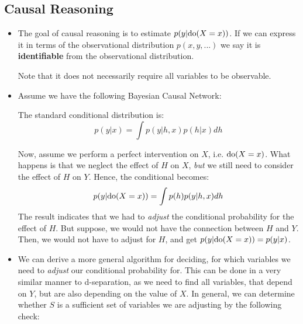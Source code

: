 \subsection{Causal Reasoning}
\begin{itemize}
	\item The goal of causal reasoning is to estimate $p(y|\textnormal{do}(X=x))$. If we can express it in terms of the observational distribution $p(x,y,...)$ we say it is \textbf{identifiable} from the observational distribution. 
	
	Note that it does not necessarily require all variables to be observable.
	\item Assume we have the following Bayesian Causal Network:
	
	\begin{figure}[ht!]
		\centering
	\end{figure}

	The standard conditional distribution is:
	$$p(y|x)=\int p(y|h,x)p(h|x)dh$$

	Now, assume we perform a perfect intervention on $X$, i.e. $\textnormal{do}(X=x)$. What happens is that we neglect the effect of $H$ on $X$, \textit{but} we still need to consider the effect of $H$ on $Y$. Hence, the conditional becomes:
	$$p(y|\textnormal{do}(X=x))=\int p(h)p(y|h,x)dh$$
	The result indicates that we had to \textit{adjust} the conditional probability for the effect of $H$. But suppose, we would not have the connection between $H$ and $Y$. Then, we would not have to adjust for $H$, and get $p(y|\textnormal{do}(X=x))=p(y|x)$.
	\item We can derive a more general algorithm for deciding, for which variables we need to \textit{adjust} our conditional probability for. This can be done in a very similar manner to d-separation, as we need to find all variables, that depend on $Y$, but are also depending on the value of $X$. In general, we can determine whether $S$ is a sufficient set of variables we are adjusting by the following check:
	

\end{itemize}
